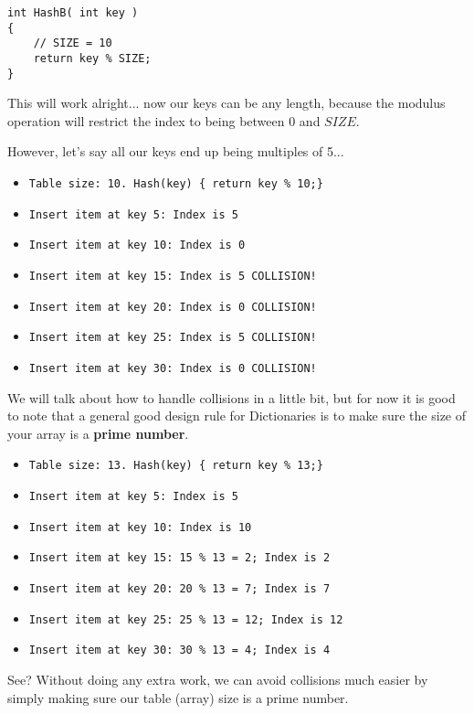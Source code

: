 \documentclass[a4paper,12pt,oneside]{book}
\begin{document}
\begin{verbatim}
int HashB( int key )
{
    // SIZE = 10
    return key % SIZE; 
}
\end{verbatim}

This will work alright... now our keys can be any length, because
the modulus operation will restrict the index to being between 0 and $SIZE$.

\newpage
However, let's say all our keys end up being multiples of 5...

\begin{itemize}
    \item \texttt{Table size: 10. Hash(key) \{ return key \% 10;\}}
    \item \texttt{Insert item at key 5: Index is 5}
    \item \texttt{Insert item at key 10: Index is 0}
    \item \texttt{Insert item at key 15: Index is 5 \tab COLLISION!}
    \item \texttt{Insert item at key 20: Index is 0 \tab COLLISION!}
    \item \texttt{Insert item at key 25: Index is 5 \tab COLLISION!}
    \item \texttt{Insert item at key 30: Index is 0 \tab COLLISION!}
\end{itemize}

We will talk about how to handle collisions in a little bit, but for now
it is good to note that a general good design rule for Dictionaries
is to make sure the size of your array is a \textbf{prime number}.

\begin{itemize}
    \item \texttt{Table size: 13. Hash(key) \{ return key \% 13;\}}
    \item \texttt{Insert item at key 5: Index is 5}
    \item \texttt{Insert item at key 10: Index is 10}
    \item \texttt{Insert item at key 15: 15 \% 13 = 2; \tab Index is 2}
    \item \texttt{Insert item at key 20: 20 \% 13 = 7; \tab Index is 7}
    \item \texttt{Insert item at key 25: 25 \% 13 = 12; \tab Index is 12 }
    \item \texttt{Insert item at key 30: 30 \% 13 = 4; \tab Index is 4 }
\end{itemize}

See? Without doing any extra work, we can avoid collisions much easier
by simply making sure our table (array) size is a prime number.
\end{document}
